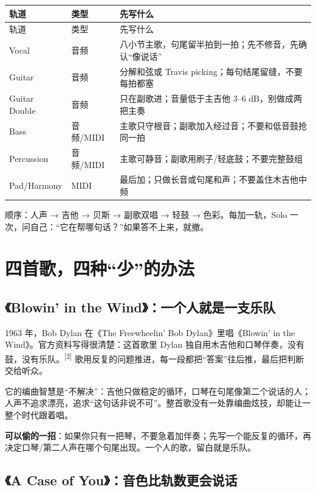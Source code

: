 \begin{longtable}{p{}p{}p{}}
\toprule
轨道 & 类型 & 先写什么 \\
\midrule
\endfirsthead
\toprule
轨道 & 类型 & 先写什么 \\
\midrule
\endhead
Vocal & 音频 & 八小节主歌，句尾留半拍到一拍；先不修音，先确认“像说话” \\
Guitar & 音频 & 分解和弦或 Travis picking；每句结尾留缝，不要每拍都塞 \\
Guitar Double & 音频 & 只在副歌进；音量低于主吉他 3--6 dB，别做成两把主奏 \\
Bass & 音频/MIDI & 主歌只守根音；副歌加入经过音；不要和低音鼓抢同一拍 \\
Percussion & 音频/MIDI & 主歌可静音；副歌用刷子/轻底鼓；不要完整鼓组 \\
Pad/Harmony & MIDI & 最后加；只做长音或句尾和声；不要盖住木吉他中频 \\
\bottomrule
\end{longtable}

顺序：人声 → 吉他 → 贝斯 → 副歌双唱 → 轻鼓 → 色彩。每加一轨，Solo 一次，问自己：“它在帮哪句话？”如果答不上来，就撤。

\section{四首歌，四种“少”的办法}
\label{sec:folk-cases}

\subsection{《Blowin' in the Wind》：一个人就是一支乐队}
\label{sec:folk-case-dylan}

1963 年，Bob Dylan 在《The Freewheelin' Bob Dylan》里唱《Blowin' in the Wind》。官方资料写得很清楚：这首歌里 Dylan 独自用木吉他和口琴伴奏，没有鼓，没有乐队。{\textsuperscript{[2]}} 歌用反复的问题推进，每一段都把“答案”往后推，最后把判断交给听众。

它的编曲智慧是“不解决”：吉他只做稳定的循环，口琴在句尾像第二个说话的人；人声不追求漂亮，追求“这句话非说不可”。整首歌没有一处靠编曲炫技，却能让一整个时代跟着唱。

\textbf{可以偷的一招}：如果你只有一把琴，不要急着加伴奏；先写一个能反复的循环，再决定口琴/第二人声在哪个句尾出现。一个人的歌，留白就是乐队。

\subsection{《A Case of You》：音色比轨数更会说话}
\label{sec:folk-case-joni}

